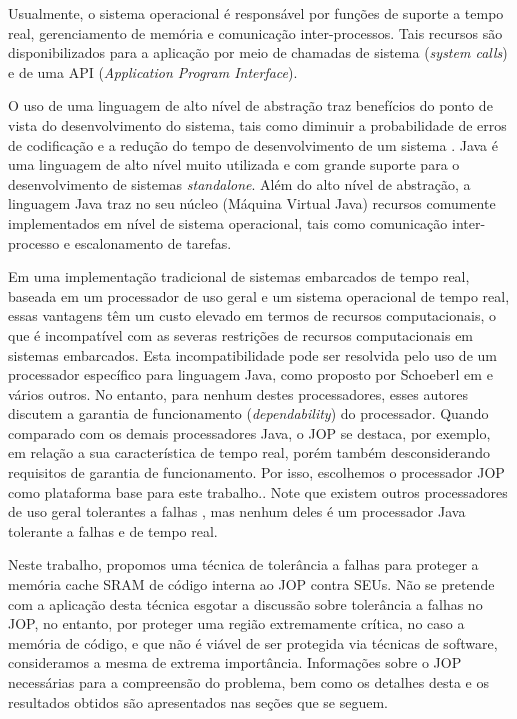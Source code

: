 \documentclass[10pt,twocolumn]{article}
\begin{document}
	Usualmente, o sistema operacional é responsável por funções de suporte a tempo real, gerenciamento de memória e comunicação inter-processos. Tais recursos são disponibilizados para a aplicação por meio de chamadas de sistema (\emph{system calls}) \cite{TanenbaumModernOS} e de uma API (\emph{Application Program Interface}).

	O uso de uma linguagem de alto nível de abstração traz benefícios do ponto de vista do desenvolvimento do sistema, tais como diminuir a probabilidade de erros de codificação e a redução do tempo de desenvolvimento de um sistema \cite{RTProgLang}. {J}ava é uma linguagem de alto nível muito utilizada e com grande suporte  para o desenvolvimento de sistemas \emph{standalone}. Além do alto nível de abstração, a linguagem {J}ava traz no seu núcleo (Máquina Virtual {J}ava) recursos comumente implementados em nível de sistema operacional, tais como comunicação inter-processo e escalonamento de tarefas.

	Em uma implementação tradicional de sistemas embarcados de tempo real, baseada em um processador de uso geral e um sistema operacional de tempo real, essas vantagens têm um custo elevado em termos de recursos computacionais, o que é incompatível com as severas restrições de recursos computacionais em sistemas embarcados. Esta incompatibilidade pode ser resolvida pelo uso de um processador específico para linguagem Java, como proposto por Schoeberl em \cite{jop:jnl:jsa2007} e vários outros\cite{femto2003}\cite{Cjip}\cite{komodo2003}\cite{pjfpga}. No entanto, para nenhum destes processadores, esses autores discutem a garantia de funcionamento (\emph {dependability}) do processador. Quando comparado com os demais processadores Java, o JOP \cite{jop:jnl:jsa2007} se destaca, por exemplo, em relação a sua ca\-racte\-rís\-tica de tempo real, porém também desconsiderando requisitos de garantia de funcionamento. Por isso, es\-co\-lhe\-mos o processador JOP como plataforma base para este trabalho.. Note que existem outros processadores de uso geral tolerantes a fa\-lhas \cite{leon3ft}\cite{erc32a}\cite{itaniumft}\cite{ibms390}\cite{8051radhard}\cite{leon3ftufrgs}, mas nenhum deles é um processador Java tolerante a fa\-lhas e de tempo real.

	Neste trabalho, propomos uma técnica de tolerância a fa\-lhas para proteger a memória cache SRAM de código interna ao JOP contra SEUs. Não se pretende com a aplicação desta técnica esgotar a discussão sobre tolerância a falhas no JOP, no entanto, por proteger uma região extremamente crítica, no caso a memória de código, e que não é viável de ser protegida via técnicas de software,  consideramos a mesma de extrema importância. Informações sobre o JOP necessárias para a compreensão do problema, bem como os detalhes desta e os resultados obtidos são apresentados nas seções que se seguem.
\end{document}
